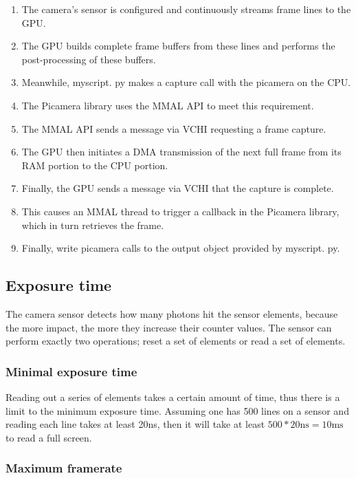 \documentclass[12pt, a4paper]{report}
\begin{document}
\begin{enumerate}
\item The camera's sensor is configured and continuously streams frame lines to the GPU.
\item The GPU builds complete frame buffers from these lines and performs the post-processing of these buffers.
\item Meanwhile, myscript. py makes a capture call with the picamera on the CPU.
\item The Picamera library uses the MMAL API to meet this requirement.
\item The MMAL API sends a message via VCHI requesting a frame capture.
\item The GPU then initiates a DMA transmission of the next full frame from its RAM portion to the CPU portion.
\item Finally, the GPU sends a message via VCHI that the capture is complete.
\item This causes an MMAL thread to trigger a callback in the Picamera library, which in turn retrieves the frame.
\item Finally, write picamera calls to the output object provided by myscript. py.
\end{enumerate}

\subsection{Exposure time}

The camera sensor detects how many photons hit the sensor elements, because the more impact, the more they increase their counter values. The sensor can perform exactly two operations; reset a set of elements or read a set of elements.

\subsubsection{Minimal exposure time}

Reading out a series of elements takes a certain amount of time, thus there is a limit to the minimum exposure time. Assuming one has 500 lines on a sensor and reading each line takes at least 20ns, then it will take at least $500*20 \text{ns} = 10 \text{ms}$ to read a full screen. 

\subsubsection{Maximum framerate}
\end{document}
